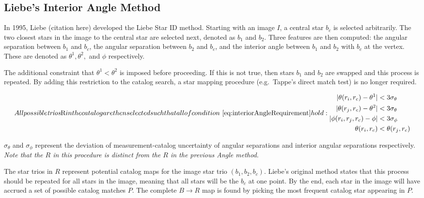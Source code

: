 \subsection{Liebe's Interior Angle Method}\label{subsec:liebe'sInteriorAngleMethod}
In 1995, Liebe (citation here) developed the Liebe Star ID method.
Starting with an image $I$, a central star $b_c$ is selected arbitrarily.
The two closest stars in the image to the central star are selected next, denoted as $b_1$ and $b_2$.
Three features are then computed: the angular separation between $b_1$ and $b_c$, the angular separation between
$b_2$ and $b_c$, and the interior angle between $b_1$ and $b_2$ with $b_c$ at the vertex.
These are denoted as $\theta^1, \theta^2,$ and $\phi$ respectively.

The additional constraint that $\theta^1 < \theta^2$ is imposed before proceeding.
If this is not true, then stars $b_1$ and $b_2$ are swapped and this process is repeated.
By adding this restriction to the catalog search, a star mapping procedure (e.g.\ Tappe's direct match test) is no
longer required.

\begin{subequations}
    \label{eq:interiorAngleRequirement}

    All possible \textit{trios} $R$ in the catalog are then selected such that all of
    condition~\eqref{eq:interiorAngleRequirement} hold:
    \begin{align}
        |\theta(r_i, r_c) - \theta^1| &< 3 \sigma_{\theta} \\
        |\theta(r_j, r_c) - \theta^2| &< 3 \sigma_{\theta} \\
        |\phi(r_i, r_j, r_c) - \phi| &< 3 \sigma_{\phi} \\
        \theta(r_i, r_c) &< \theta(r_j, r_c)
    \end{align}
\end{subequations}

$\sigma_{\theta}$ and $\sigma_{\phi}$ represent the deviation of measurement-catalog uncertainty of angular separations
and interior angular separations respectively.
\textit{Note that the $R$ in this procedure is distinct from the $R$ in the previous Angle method.}

The star trios in $R$ represent potential catalog maps for the image star trio $(b_1, b_2, b_c)$.
Liebe's original method states that this process should be repeated for all stars in the image, meaning that all
stars will be the $b_c$ at one point.
By the end, each star in the image will have accrued a set of possible catalog matches $P$.
The complete $B \rightarrow R$ map is found by picking the most frequent catalog star appearing in $P$.

